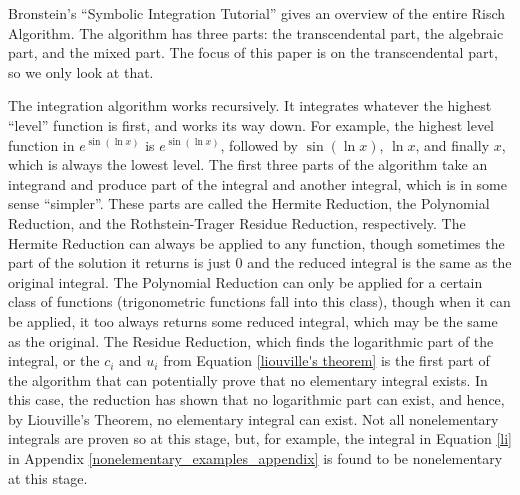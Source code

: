 Bronstein's ``Symbolic Integration Tutorial''
\cite{bronstein1998symbolic} gives an overview of the entire Risch
Algorithm.  The algorithm has three parts:  the \gls{transcendental}
part, the \gls{algebraic} part, and the mixed part.  The focus of this
paper is on the \gls{transcendental} part, so we only look at that.

The \gls{integration} algorithm works recursively.  It integrates whatever the
highest ``level'' function is first, and works its way down.  For example,
the highest level function in $e^{\sin{(\ln{x})}}$ is
$e^{\sin{(\ln{x})}}$, followed by $\sin{(\ln{x})}$, $\ln{x}$, and
finally $x$, which is always the lowest level. The first three parts of
the algorithm take an \gls{integrand} and produce part of the integral
and another integral, which is in some sense ``simpler''. These parts
are called the Hermite Reduction, the Polynomial Reduction, and the
Rothstein-Trager Residue Reduction, respectively.  The Hermite Reduction
can always be applied to any function, though sometimes the part of the
solution it returns is just 0 and the reduced integral is the same as
the original integral.  The Polynomial Reduction can only be applied for
a certain class of functions (trigonometric functions fall into this
class), though when it can be applied, it too always returns some
reduced integral, which may be the same as the original.  The Residue
Reduction, which finds the logarithmic part of the integral, or the
$c_i$ and $u_i$ from Equation \ref{liouville's theorem} is the first
part of the algorithm that can potentially prove that no \gls{elementary}
integral exists.  In this case, the reduction has shown that no
logarithmic part can exist, and hence, by Liouville's Theorem, no
\gls{elementary} integral can exist.  Not all nonelementary
integrals are proven so at this stage, but, for example, the integral in
Equation \ref{li} in Appendix \ref{nonelementary_examples_appendix} is
found to be nonelementary at this stage.

